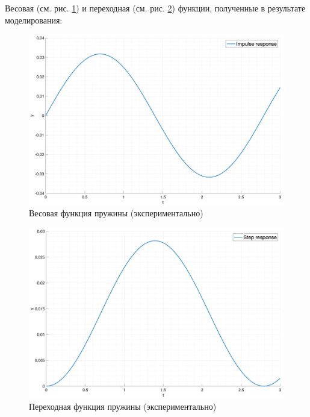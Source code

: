 Весовая (см. рис. \ref{fig:task4_impulse_response_exp}) и переходная (см. рис. \ref{fig:task4_step_response_exp}) функции, полученные в результате моделирования:
\begin{figure}[ht!]
    \centering
    \includegraphics[width=\textwidth]{media/plots/task4_impulse_response_exp.png}
    \caption{Весовая функция пружины (экспериментально)}
    \label{fig:task4_impulse_response_exp}
\end{figure}
\begin{figure}[ht!]
    \centering
    \includegraphics[width=\textwidth]{media/plots/task4_step_response_exp.png}
    \caption{Переходная функция пружины (экспериментально)}
    \label{fig:task4_step_response_exp}
\end{figure}

